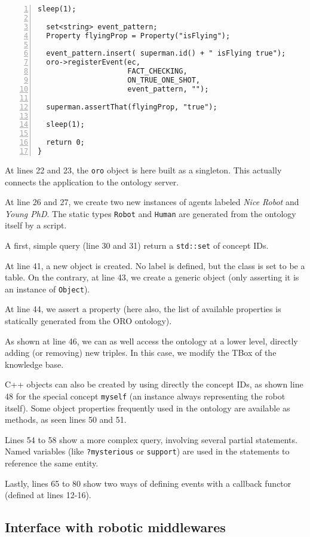 \begin{lstlisting}[numbers=left,caption=Example of interaction with {\tt oro-server} in C++, label = code|ex-cpp]
  sleep(1);
  
  set<string> event_pattern;
  Property flyingProp = Property("isFlying");
  
  event_pattern.insert( superman.id() + " isFlying true");
  oro->registerEvent(ec, 
                     FACT_CHECKING, 
                     ON_TRUE_ONE_SHOT, 
                     event_pattern, "");
  
  superman.assertThat(flyingProp, "true");
  
  sleep(1);
  
  return 0;
}

\end{lstlisting}

At lines 22 and 23, the {\tt oro} object is here built as a singleton. This
actually connects the application to the ontology server.

At line 26 and 27, we create two new instances of agents labeled \emph{Nice
Robot} and \emph{Young PhD}. The static types {\tt Robot} and {\tt Human} are
generated from the ontology itself by a script.

A first, simple query (line 30 and 31) return a {\tt std::set} of concept IDs.

At line 41, a new object is created. No label is defined, but the
class is set to be a table. On the contrary, at line 43, we create a generic
object (only asserting it is an instance of {\tt Object}).

At line 44, we assert a property (here also, the list of available properties is
statically generated from the ORO ontology).

As shown at line 46, we can as well access the ontology at a lower level,
directly adding (or removing) new triples. In this case, we modify the TBox of
the knowledge base.

C++ objects can also be created by using directly the concept IDs, as shown
line 48 for the special concept {\tt myself} (an instance always representing
the robot itself). Some object properties frequently used in the ontology are
available as methods, as seen lines 50 and 51.

Lines 54 to 58 show a more complex query, involving several partial statements.
Named variables (like {\tt ?mysterious} or {\tt support}) are used in the
statements to reference the same entity.

Lastly, lines 65 to 80 show two ways of defining events with a callback functor
(defined at lines 12-16).

\subsection{Interface with robotic middlewares}
\label{sect|interfacing-middlewares}

